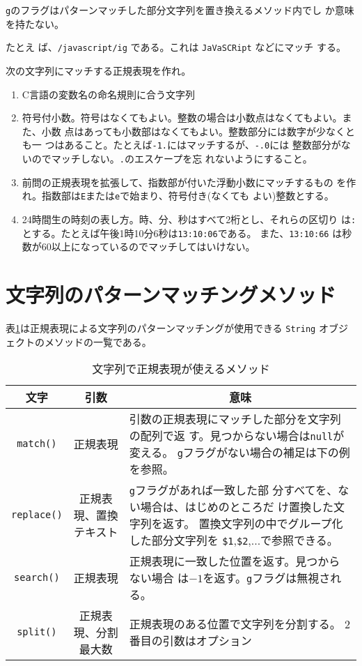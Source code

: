 \Verb+g+のフラグはパターンマッチした部分文字列を置き換えるメソッド内でし
か意味を持たない。

たとえ
ば、\Verb+/javascript/ig+ である。これは \Verb+JaVaSCRipt+ などにマッチ
する。
\begin{Prob}\upshape
次の文字列にマッチする正規表現を作れ。
\begin{enumerate}
 \item C言語の変数名の命名規則に合う文字列
 \item 符号付小数。符号はなくてもよい。整数の場合は小数点はなくてもよい。また、小数
       点はあっても小数部はなくてもよい。整数部分には数字が少なくとも一
       つはあること。たとえば\Verb+-1.+にはマッチするが、\Verb+-.0+には
       整数部分がないのでマッチしない。\Verb+.+のエスケープを忘
       れないようにすること。
 \item 前問の正規表現を拡張して、指数部が付いた浮動小数にマッチするもの
       を作れ。指数部は\Verb+E+または\Verb+e+で始まり、符号付き(なくても
       よい)整数とする。
 \item 24時間生の時刻の表し方。時、分、秒はすべて2桁とし、それらの区切り
       は\Verb+:+とする。たとえば午後1時10分6秒は\Verb+13:10:06+である。
  また、\Verb+13:10:66+ は秒数が60以上になっているのでマッチしてはいけない。
\end{enumerate}
\end{Prob}
\section{文字列のパターンマッチングメソッド}
表\ref{RegMwthod}は正規表現による文字列のパターンマッチングが使用できる \Verb+String+
オブジェクトのメソッドの一覧である。
\begin{table}[ht]
\caption{文字列で正規表現が使えるメソッド}\label{RegMwthod}
\begin{center}
 \begin{tabular}{|c|c|m{}|}\hline
  文字&\multicolumn{1}{c|}{引数}&\multicolumn{1}{c|}{意味}\\\hline
\Verb+match()+&正規表現&引数の正規表現にマッチした部分を文字列の配列で返
	  す。見つからない場合は\Verb+null+が変える。
          \Verb+g+フラグがない場合の補足は下の例を参照。\\\hline
\Verb+replace()+&正規表現、\newline 置換テキスト&\Verb+g+フラグがあれば一致した部
	  分すべてを、ない場合は、はじめのところだ
	  け置換した文字列を返す。\newline
          置換文字列の中でグループ化した部分文字列を
	  \Verb+$1+,\Verb+$2+,...で参照できる。\\\hline
\Verb+search()+&正規表現&正規表現に一致した位置を返す。見つからない場合
	  は$-1$を返す。\Verb+g+フラグは無視される。\\\hline
\Verb+split()+&正規表現、\newline 分割最大数&正規表現のある位置で文字列を分割する。
	  2番目の引数はオプション\\\hline
\end{tabular}
\end{center}
\end{table}

